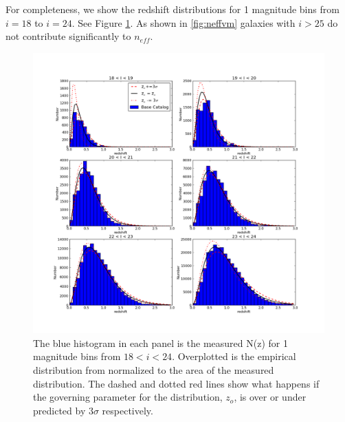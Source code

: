 \documentclass[]{article}
\begin{document}
{For completeness, we show the redshift distributions for 1 magnitude bins from $i=18$ to $i=24$.  See Figure \ref{fig:nofz18_24}.  As shown in \ref{fig:neffvm}
galaxies with $i > 25$ do not contribute significantly to $n_{eff}$. 
\begin{figure}[H]
\centering
\includegraphics[width=5in]{validation_figures/Nofz_18_24.png}
\caption{The blue histogram in each panel is the measured N(z) for 1 magnitude bins from $18<i<24$.  Overplotted is the empirical distribution from \citet{coil04} normalized to the area of the measured distribution.  The dashed and dotted red lines show what happens if the governing parameter for the \citet{coil04} distribution, $z_o$, is over
or under predicted by $3\sigma$ respectively.\label{fig:nofz18_24}}
\end{figure}
}
\end{document}
